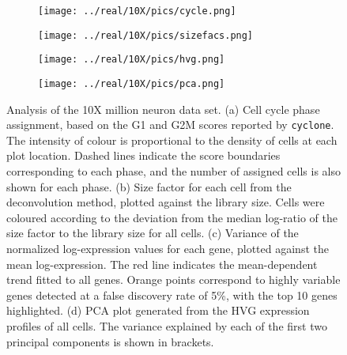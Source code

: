 \documentclass[10pt,letterpaper]{article}
\newcommand{\code}[1]{\texttt{#1}}
\begin{document}
\begin{figure}
    \begin{subfigure}[b]{0.49\textwidth}
        \texttt{[image: ../real/10X/pics/cycle.png]}
        \caption{}
    \end{subfigure}
    \begin{subfigure}[b]{0.49\textwidth}
        \texttt{[image: ../real/10X/pics/sizefacs.png]}
        \caption{}
    \end{subfigure}
    \begin{subfigure}[b]{0.49\textwidth}
        \texttt{[image: ../real/10X/pics/hvg.png]}
        \caption{}
    \end{subfigure}
    \begin{subfigure}[b]{0.49\textwidth}
        \texttt{[image: ../real/10X/pics/pca.png]}
        \caption{}
    \end{subfigure}
    \caption{Analysis of the 10X million neuron data set.
        (a) Cell cycle phase assignment, based on the G1 and G2M scores reported by \code{cyclone}.
        The intensity of colour is proportional to the density of cells at each plot location.
        Dashed lines indicate the score boundaries corresponding to each phase, and the number of assigned cells is also shown for each phase.
        (b) Size factor for each cell from the deconvolution method, plotted against the library size.
        Cells were coloured according to the deviation from the median log-ratio of the size factor to the library size for all cells.
        (c) Variance of the normalized log-expression values for each gene, plotted against the mean log-expression.
        The red line indicates the mean-dependent trend fitted to all genes.
        Orange points correspond to highly variable genes detected at a false discovery rate of 5\%, with the top 10 genes highlighted.
        (d) PCA plot generated from the HVG expression profiles of all cells.
        The variance explained by each of the first two principal components is shown in brackets.
    }
    \label{fig:tenx}
\end{figure}
\end{document}
